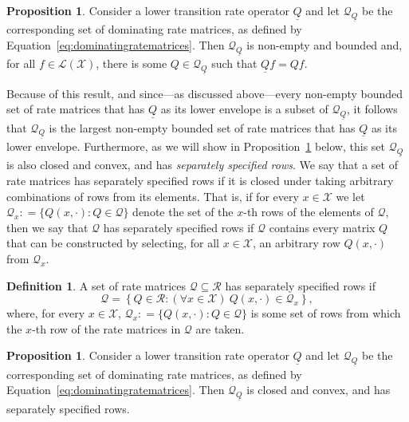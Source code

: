 \documentclass[10pt,a4paper]{paper}
\theoremstyle{definition}
\newtheorem{proposition}[theorem]{Proposition}
\newtheorem{definition}{Definition}
\newcommand{\states}{\mathcal{X}}
\newcommand{\gambles}{\mathcal{L}}
\newcommand{\gamblesX}{\gambles(\states)}
\newcommand{\rateset}{\mathcal{Q}}
\newcommand{\lrate}{\underline{Q}}
\newcommand{\coloneqq}{:\!=}
\begin{document}
\begin{proposition}\label{prop:dominating_nonempty_bounded}
Consider a lower transition rate operator $\lrate$ and let $\rateset_{\lrate}$ be the corresponding set of dominating rate matrices, as defined by Equation~\eqref{eq:dominatingratematrices}. Then $\rateset_{\lrate}$ is non-empty and bounded and, for all $f\in\gamblesX$, there is some $Q\in\rateset_{\lrate}$ such that $\lrate f=Qf$.
\end{proposition}

\noindent
Because of this result, and since---as discussed above---every non-empty bounded set of rate matrices that has $\lrate$ as its lower envelope is a subset of $\rateset_{\lrate}$, it follows that $\rateset_{\lrate}$ is the largest non-empty bounded set of rate matrices that has $\lrate$ as its lower envelope.
Furthermore, as we will show in Proposition~\ref{prop:dominatingproperties} below, this set $\rateset_{\lrate}$ is also closed and convex, and has \emph{separately specified rows}. We say that a set of rate matrices has separately specified rows if it is closed under taking arbitrary combinations of rows from its elements. That is, if for every $x\in\states$ we let $\rateset_x\coloneqq\{Q(x,\cdot):Q\in\rateset\}$ denote the set of the $x$-th rows of the elements of $\rateset$, then we say that $\rateset$ has separately specified rows if $\rateset$ contains every matrix $Q$ that can be constructed by selecting, for all $x\in\states$, an arbitrary row $Q(x,\cdot)$ from $\rateset_x$.

\begin{definition}\label{def:separatelyspecifiedrows}
A set of rate matrices $\rateset\subseteq\mathcal{R}$ has separately specified rows if
\begin{equation*}
\rateset=\left\{
Q\in\mathcal{R}
\colon
(\forall x\in\states)~Q(x,\cdot)\in\rateset_x\right\},
\end{equation*}
where, for every $x\in\states$, $\rateset_x\coloneqq\{Q(x,\cdot)\colon Q\in\rateset\}$ is some set of rows from which the $x$-th row of the rate matrices in $\rateset$ are taken.
\end{definition}

\begin{proposition}\label{prop:dominatingproperties}
Consider a lower transition rate operator $\lrate$ and let $\rateset_{\lrate}$ be the corresponding set of dominating rate matrices, as defined by Equation~\eqref{eq:dominatingratematrices}. Then $\rateset_{\lrate}$ is closed and convex, and has separately specified rows.
\end{proposition}
\end{document}
